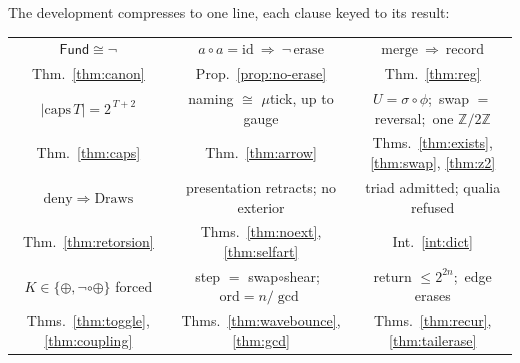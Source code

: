 \documentclass[11pt,a4paper]{article}
\theoremstyle{plain}
\theoremstyle{definition}
\theoremstyle{remark}
\newcommand{\Fund}{\mathsf{Fund}}
\newcommand{\comp}{\circ}
\newcommand{\Ztwo}{\mathbb{Z}/2\mathbb{Z}}
\newcommand{\act}{a}
\begin{document}
The development compresses to one line, each clause keyed to its
result:
\begin{center}
{\small
\renewcommand{\arraystretch}{1.0}
\begin{tabular}{@{}c@{\quad}c@{\quad}c@{}}
$\Fund\cong\neg$ &
$\act\comp\act=\mathrm{id}\ \Rightarrow\ \neg\,\mathrm{erase}$ &
$\mathrm{merge}\ \Rightarrow\ \mathrm{record}$ \\
{\scriptsize\color{muted} Thm.~\ref{thm:canon}} &
{\scriptsize\color{muted} Prop.~\ref{prop:no-erase}} &
{\scriptsize\color{muted} Thm.~\ref{thm:reg}} \\[5pt]
$|\mathrm{caps}\,T|=2^{\,T+2}$ &
naming $\cong$ $\mu$tick, up to gauge &
$U=\sigma\comp\phi$;\ swap $=$ reversal;\ one $\Ztwo$ \\
{\scriptsize\color{muted} Thm.~\ref{thm:caps}} &
{\scriptsize\color{muted} Thm.~\ref{thm:arrow}} &
{\scriptsize\color{muted} Thms.~\ref{thm:exists}, \ref{thm:swap}, \ref{thm:z2}} \\[5pt]
$\mathrm{deny}\Rightarrow\mathrm{Draws}$ &
presentation retracts; no exterior &
triad admitted; qualia refused \\
{\scriptsize\color{muted} Thm.~\ref{thm:retorsion}} &
{\scriptsize\color{muted} Thms.~\ref{thm:noext}, \ref{thm:selfart}} &
{\scriptsize\color{muted} Int.~\ref{int:dict}} \\[5pt]
$K\in\{\oplus,\neg\comp\oplus\}$ forced &
step $=$ swap$\comp$shear;\ $\mathrm{ord}=n/\gcd$ &
return $\le 2^{2n}$;\ edge erases \\
{\scriptsize\color{muted} Thms.~\ref{thm:toggle}, \ref{thm:coupling}} &
{\scriptsize\color{muted} Thms.~\ref{thm:wavebounce}, \ref{thm:gcd}} &
{\scriptsize\color{muted} Thms.~\ref{thm:recur}, \ref{thm:tailerase}} \\
\end{tabular}}
\end{center}
\end{document}
